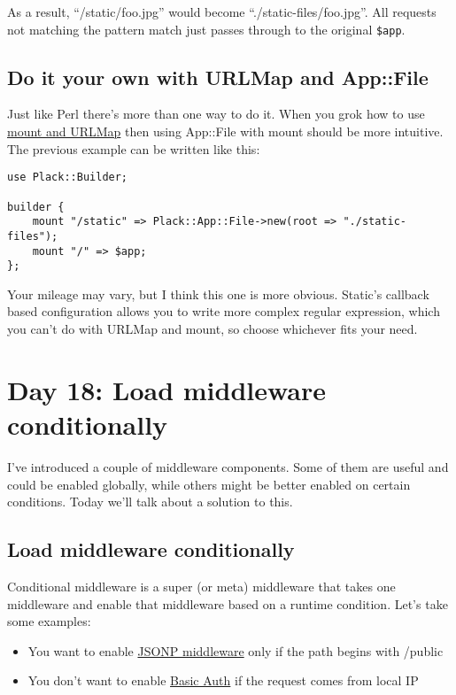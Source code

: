 As a result, ``/static/foo.jpg'' would become
``./static-files/foo.jpg''. All requests not matching the pattern match
just passes through to the original \lstinline!$app!.

\section{Do it your own with URLMap and
App::File}\label{do-it-your-own-with-urlmap-and-appfile}

Just like Perl there's more than one way to do it. When you grok how to
use
\href{http://advent.plackperl.org/2009/12/day-12-maps-multiple-apps-with-mount-and-urlmap.html}{mount
and URLMap} then using App::File with mount should be more intuitive.
The previous example can be written like this:

\begin{lstlisting}
use Plack::Builder;

builder {
    mount "/static" => Plack::App::File->new(root => "./static-files");
    mount "/" => $app;
};
\end{lstlisting}

Your mileage may vary, but I think this one is more obvious. Static's
callback based configuration allows you to write more complex regular
expression, which you can't do with URLMap and mount, so choose
whichever fits your need.

\chapter{Day 18: Load middleware
conditionally}\label{day-18-load-middleware-conditionally}

I've introduced a couple of middleware components. Some of them are
useful and could be enabled globally, while others might be better
enabled on certain conditions. Today we'll talk about a solution to
this.

\section{Load middleware
conditionally}\label{load-middleware-conditionally}

Conditional middleware is a super (or meta) middleware that takes one
middleware and enable that middleware based on a runtime condition.
Let's take some examples:

\begin{itemize}
\itemsep1pt\parskip0pt
\item
  You want to enable
  \href{http://advent.plackperl.org/2009/12/day-16-adding-jsonp-support-to-your-app.html}{JSONP
  middleware} only if the path begins with /public
\item
  You don't want to enable
  \href{http://advent.plackperl.org/2009/12/day-15-authenticate-your-app-with-middleware.html}{Basic
  Auth} if the request comes from local IP
\end{itemize}

